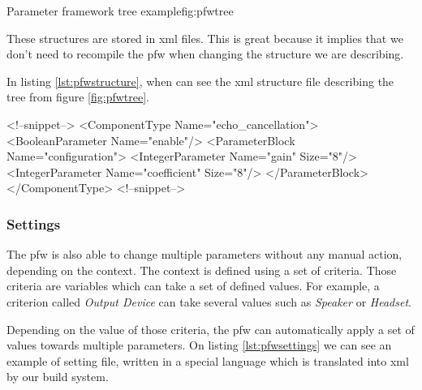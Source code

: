 \begin{figureGraphics}{Parameter framework tree example}{fig:pfwtree}
\end{figureGraphics}

These structures are stored in \gls{xml} files. This is great because it implies that we don't need
to recompile the \gls{pfw} when changing the structure we are describing.

In listing \ref{lst:pfwstructure}, when can see the \gls{xml} structure file
describing the tree from figure \ref{fig:pfwtree}.

\begin{code}[language=pfwXml, caption=Structure file example snippet, label=lst:pfwstructure]
<!--snippet-->
<ComponentType Name="echo_cancellation">
    <BooleanParameter Name="enable"/>
    <ParameterBlock Name="configuration">
        <IntegerParameter Name="gain" Size="8"/>
        <IntegerParameter Name="coefficient" Size="8"/>
    </ParameterBlock>
</ComponentType>
<!--snippet-->
\end{code}

\subsubsection{Settings}
The \gls{pfw} is also able to change multiple parameters without any manual action, depending on the context.
The context is defined using a set of criteria. Those criteria are variables which can take a set of defined values.
For example, a criterion called \emph{Output Device} can take several values such as \emph{Speaker} or \emph{Headset}.

Depending on the value of those criteria, the \gls{pfw} can automatically apply a set of values towards
multiple parameters.
On listing \ref{lst:pfwsettings} we can see an example of setting file, written in a special language
which is translated into \gls{xml} by our build system.

